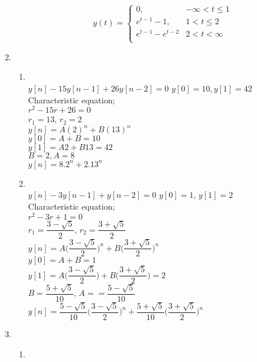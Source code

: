 \documentclass[10pt,a4paper, margin=1in]{article}
\begin{document}
\begin{enumerate}
\begin{enumerate}
		\[   
		y(t) = 
		\begin{cases}
		\text{0,} & -\infty < t \le1\\
		e^{t-1}-1, & 1 < t \le 2 \\
		e^{t-1}-e^{t-2} &2 < t < \infty\\
		\end{cases}
		\]
\end{enumerate}
\item %
\ \\
\begin{enumerate}
	\item %
	\ \\
	$y[n]-15y[n-1]+26y[n-2]=0$ \qquad $y[0]=10 , y[1]=42$\\
	Characteristic equation;\\
	\null \qquad $r^2-15r+26=0$\\
	\null \qquad $r_1=13$, $r_2 = 2$\\
	$y[n] = A(2)^n+B(13)^n$\\
	$y[0]=A+B = 10$\\
	$y[1]=A2+B13 = 42$\\
	$B=2,A=8$\\
	$y[n]=8.2^n+2.13^n$\\
	\item %
	\ \\
	$y[n]-3y[n-1]+y[n-2]=0$ \qquad $y[0]=1$, $y[1]=2$\\
	Characteristic equation;\\
	\null \qquad $r^2-3r+1=0$\\
	\null \qquad $r_1=\dfrac{3-\sqrt{5}}{2}$, $r_2=\dfrac{3+\sqrt{5}}{2}$\\
	$y[n]= A \Big(\dfrac{3-\sqrt{5}}{2}\Big)^n + B\Big(\dfrac{3+\sqrt{5}}{2}\Big)^n$\\
	$y[0]= A+B = 1$\\
	$y[1]= A\Big(\dfrac{3-\sqrt{5}}{2}\Big)+B\Big(\dfrac{3+\sqrt{5}}{2}\Big)=2$\\
	$B=\dfrac{5+\sqrt{5}}{10}$, $A==\dfrac{5-\sqrt{5}}{10}$\\
	$y[n]= \dfrac{5-\sqrt{5}}{10} \Big(\dfrac{3-\sqrt{5}}{2}\Big)^n + \dfrac{5+\sqrt{5}}{10} \Big(\dfrac{3+\sqrt{5}}{2}\Big)^n $
\end{enumerate}
\item 
\ \\
    \begin{enumerate}
    \item %
    \ \\

\end{enumerate}
\end{enumerate}
\end{document}
